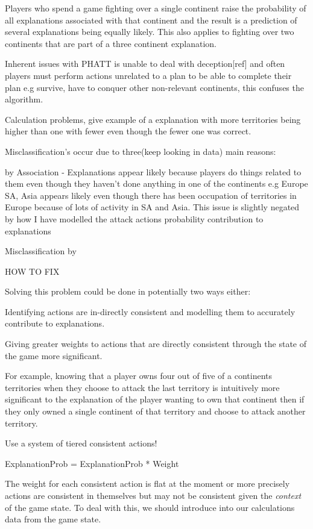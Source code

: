 \documentclass[parskip]{cs4rep}
\begin{document}
Players who spend a game fighting over a single continent raise the probability of all explanations associated with that continent and the result is a prediction of several explanations being equally likely. This also applies to fighting over two continents that are part of a three continent explanation.

Inherent issues with PHATT is unable to deal with deception[ref] and often players must perform actions unrelated to a plan to be able to complete their plan e.g survive, have to conquer other non-relevant continents, this confuses the algorithm.

Calculation problems, give example of a explanation with more territories being higher than one with fewer even though the fewer one was correct.

Misclassification's occur due to three(keep looking in data) main reasons:

by Association - Explanations appear likely because players do things related to them even though they haven't done anything in one of the continents e.g Europe SA, Asia appears likely even though there has been occupation of territories in Europe because of lots of activity in SA and Asia. This issue is slightly negated by how I have modelled the attack actions probability contribution to explanations

Misclassification by 

HOW TO FIX

Solving this problem could be done in potentially two ways either:

Identifying actions are in-directly consistent and modelling them to accurately contribute to explanations.
 
Giving greater weights to actions that are directly consistent through the state of the game  more significant.

For example, knowing that a player owns four out of five of a continents territories when they choose to attack the last territory is intuitively more significant to the explanation of the player wanting to own that continent then if they only owned a single continent of that territory and choose to attack another territory.

Use a system of tiered consistent actions!

ExplanationProb = ExplanationProb * Weight

The weight for each consistent action is flat at the moment or more precisely actions are consistent in themselves but may not be consistent given the \textit{context} of the game state. To deal with this, we should introduce into our calculations data from the game state.
\end{document}
